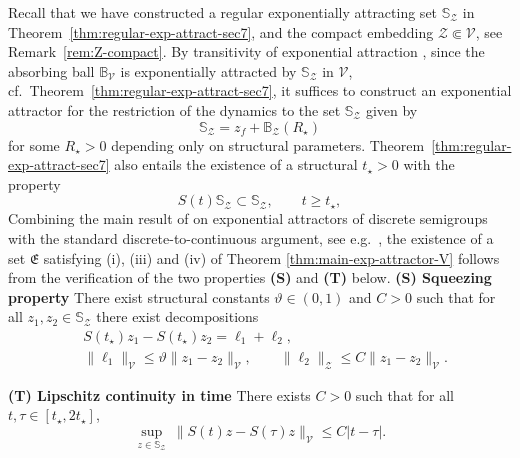 \documentclass[12pt,leqno]{amsart}
\theoremstyle{definition}
\numberwithin{equation}{section}
\numberwithin{figure}{section}
\begin{document}
Recall that we have constructed a  regular exponentially attracting set $\mathbb S_{\mathcal Z}$ in
Theorem~\ref{thm:regular-exp-attract-sec7}, and the compact embedding $\mathcal Z\Subset \mathcal V$,
see Remark~\ref{rem:Z-compact}.
By transitivity of exponential attraction \cite{FGMZ}, since the absorbing ball $\mathbb B_{\mathcal V}$ is exponentially
attracted by $\mathbb S_{\mathcal Z}$ in $\mathcal V$, cf.\ Theorem~\ref{thm:regular-exp-attract-sec7},
it suffices to construct an exponential attractor for the restriction of the dynamics to  the set $\mathbb S_{\mathcal Z}$ given by
\begin{equation}\label{eq:B-set-sec8}
 \mathbb S_{\mathcal Z}=z_f+\mathbb B_{\mathcal Z}(R_\star)
\end{equation} for some $R_\star>0$ depending only on structural parameters. Theorem~\ref{thm:regular-exp-attract-sec7} also entails the existence of  a structural $t_\star>0$ with the property \begin{equation}\label{eq:Sinvariance8}
 S(t)\mathbb S_{\mathcal Z} \subset  \mathbb S_{\mathcal Z} , \qquad t\geq t_\star,\end{equation}
Combining the  main result of \cite{EMZ} on exponential attractors of discrete semigroups with the standard discrete-to-continuous argument, see e.g.\ \cite[Section 8]{CGDP2010}, the existence of a set $\mathfrak E$ satisfying (i), (iii) and (iv) of Theorem \ref{thm:main-exp-attractor-V} follows from the verification of the two properties \textbf{(S)} and \textbf{(T)} below. \smallskip
\noindent\textbf{(S) Squeezing property}
There exist  structural constants $\vartheta\in(0,1)$ and $C>0$ such that for all $z_1,z_2\in  \mathbb S_{\mathcal Z}$
there exist decompositions
\begin{equation}\label{eq:squeeze-decomp-sec8}
\begin{split}
&S(t_\star)z_1-S(t_\star)z_2=\ell_1+\ell_2,
\\
&
\|\ell_1\|_{\mathcal V}\le \vartheta\|z_1-z_2\|_{\mathcal V},
\qquad
\|\ell_2\|_{\mathcal Z}\le C\|z_1-z_2\|_{\mathcal V}.
\end{split}
\end{equation}

\smallskip
\noindent\textbf{(T) Lipschitz continuity in time}
There exists $C>0$ such that for all $t,\tau\in[t_\star,2t_\star]$,
\begin{equation}\label{eq:time-Lip-sec8}
\sup_{z\in \mathbb S_{\mathcal Z}}\ \|S(t)z-S(\tau)z\|_{\mathcal V}\le C|t-\tau|.
\end{equation}
\end{document}
